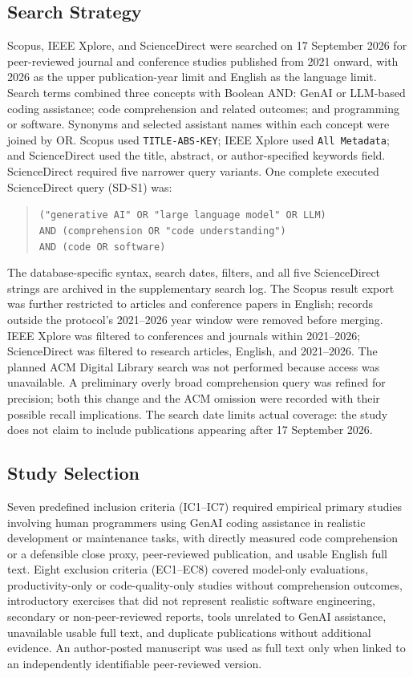 \documentclass[conference]{IEEEtran}
\begin{document}
\subsection{Search Strategy}
Scopus, IEEE Xplore, and ScienceDirect were searched on 17 September 2026 for peer-reviewed journal and conference studies published from 2021 onward, with 2026 as the upper publication-year limit and English as the language limit. Search terms combined three concepts with Boolean AND: GenAI or LLM-based coding assistance; code comprehension and related outcomes; and programming or software. Synonyms and selected assistant names within each concept were joined by OR. Scopus used \texttt{TITLE-ABS-KEY}; IEEE Xplore used \texttt{All Metadata}; and ScienceDirect used the title, abstract, or author-specified keywords field. ScienceDirect required five narrower query variants. One complete executed ScienceDirect query (SD-S1) was:

\begin{quote}
\footnotesize\raggedright
\texttt{("generative AI" OR "large language model" OR LLM)}\\
\texttt{AND (comprehension OR "code understanding")}\\
\texttt{AND (code OR software)}
\end{quote}

The database-specific syntax, search dates, filters, and all five ScienceDirect strings are archived in the supplementary search log. The Scopus result export was further restricted to articles and conference papers in English; records outside the protocol's 2021--2026 year window were removed before merging. IEEE Xplore was filtered to conferences and journals within 2021--2026; ScienceDirect was filtered to research articles, English, and 2021--2026. The planned ACM Digital Library search was not performed because access was unavailable. A preliminary overly broad comprehension query was refined for precision; both this change and the ACM omission were recorded with their possible recall implications. The search date limits actual coverage: the study does not claim to include publications appearing after 17 September 2026.

\subsection{Study Selection}
Seven predefined inclusion criteria (IC1--IC7) required empirical primary studies involving human programmers using GenAI coding assistance in realistic development or maintenance tasks, with directly measured code comprehension or a defensible close proxy, peer-reviewed publication, and usable English full text. Eight exclusion criteria (EC1--EC8) covered model-only evaluations, productivity-only or code-quality-only studies without comprehension outcomes, introductory exercises that did not represent realistic software engineering, secondary or non-peer-reviewed reports, tools unrelated to GenAI assistance, unavailable usable full text, and duplicate publications without additional evidence. An author-posted manuscript was used as full text only when linked to an independently identifiable peer-reviewed version.
\end{document}
